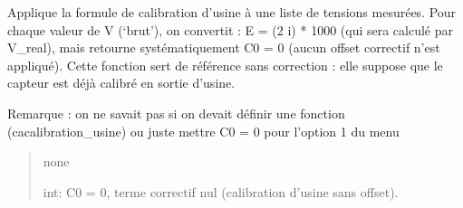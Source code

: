 \documentclass[letterpaper,10pt,english]{sphinxmanual}
\begin{document}

\begin{fulllineitems}
\label{\detokenize{calibration:calibration.calibration_usine}}
\pysigstartsignatures
\pysiglinewithargsret
{}
{}
{}
\pysigstopsignatures\begin{description}
\sphinxlineitem{}
\sphinxAtStartPar
Applique la formule de calibration d’usine à une liste de tensions mesurées.
Pour chaque valeur de V (‘brut’), on convertit : E = (2 \sphinxhyphen{} i) * 1000 (qui sera calculé par V\_real), mais retourne
systématiquement C0 = 0 (aucun offset correctif n’est appliqué).
Cette fonction sert de référence sans correction : elle suppose que le capteur
est déjà calibré en sortie d’usine.

\end{description}

\sphinxAtStartPar
Remarque : on ne savait pas si on devait définir une fonction (cacalibration\_usine) ou  juste mettre C0 = 0 pour l’option 1 du menu
\begin{quote}
\begin{description}
\sphinxAtStartPar
none

\sphinxAtStartPar
int: C0 = 0, terme correctif nul (calibration d’usine sans offset).

\end{description}
\end{quote}

\end{fulllineitems}

\end{document}
